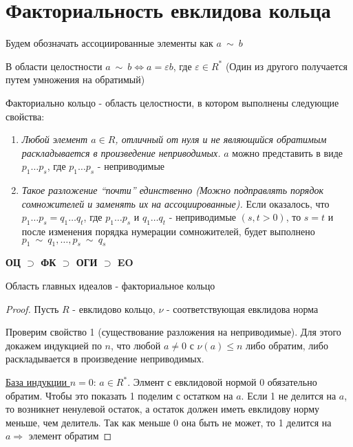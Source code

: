 
\section{Факториальность евклидова кольца}
\begin{normalsize}
    Будем обозначать ассоциированные элементы как $a \  \mathtt{\sim} \  b$
    
    В области целостности $a \  \mathtt{\sim} \  b \Longleftrightarrow a = \varepsilon b$, где $\varepsilon \in R^*$ 
    (Один из другого получается путем умножения на обратимый)

    \begin{conj}
        Факториально кольцо - область целостности, в котором выполнены следующие свойства:
        \begin{enumerate}
            \item \textit{Любой элемент $a \in R$, отличный от нуля и не являющийся обратимым раскладывается в
            произведение неприводимых.} $a$ можно представить в виде $p_1 \dots p_s$, где $p_1 \dots p_s$ - неприводимые
            \item \textit{Такое разложение ``почти'' единственно (Можно подправлять порядок сомножителей и заменять их на ассоциированные).
            } Если оказалось, что $p_1 \dots p_s = q_1 \dots q_t$, где $p_1 \dots p_s$ и $q_1 \dots q_t$ 
            - неприводимые $(s, t > 0)$, то $s = t$ и после изменения порядка нумерации сомножителей, будет выполнено $p_1 \  \mathtt{\sim} \  q_1, \dots, p_s \  \mathtt{\sim} \  q_s$
        \end{enumerate}
    \end{conj}
    \textbf{ОЦ $\supset$ ФК $\supset$ ОГИ $\supset$ EO}
    \begin{theorem-non}
        Область главных идеалов - факториальное кольцо
    \end{theorem-non}
    \begin{proof}
        Пусть $R$ - евклидово кольцо, $\nu$ - соответствующая евклидова норма

        Проверим свойство 1 (существование разложения на неприводимые).
        Для этого докажем индукцией по $n$, что любой $a \neq 0$ с $\nu(a) \leqslant n$ либо обратим, 
        либо раскладывается в произведение неприводимых. 

        \underline{База индукции $n = 0$}: $a \in R^*$. Элмент с евклидовой нормой 0 обязательно обратим. Чтобы это показать 
        1 поделим с остатком на $a$. Если 1 не делится на $a$, то возникнет ненулевой остаток, а остаток должен
        иметь евклидову норму меньше, чем делитель. Так как меньше 0 она быть не может, то 1 делится на $a \Longrightarrow$ элемент обратим


\end{proof}
\end{normalsize}
